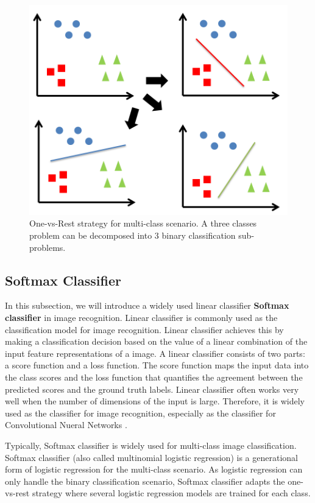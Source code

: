 \begin{figure}
	\centering
	\includegraphics[scale=.8]{relatedwork/fig/ovsa.png}
	\caption{One-vs-Rest strategy for multi-class scenario. A three classes problem can be decomposed into 3 binary classification sub-problems.}\label{fig:related:ovsa}
\end{figure}
\subsection{Softmax Classifier}
In this subsection, we will introduce a widely used linear classifier \textbf{Softmax classifier} in image recognition. Linear classifier is commonly used as the classification model for image recognition. Linear classifier achieves this by making a classification decision based on the value of a linear combination of the input feature representations of a image. A linear classifier consists of two parts: a score function and a loss function\cite{vapnik1999overview}. The score function maps the input data into the class scores and the loss function that quantifies the agreement between the predicted scores and the ground truth labels. Linear classifier often works very well when the number of dimensions of the input is large. Therefore, it is widely used as the classifier for image recognition, especially as the classifier for Convolutional Nueral Networks \cite{lecun1989backpropagation}. 

Typically, Softmax classifier is widely used for multi-class image classification.
Softmax classifier (also called multinomial logistic regression) is a generational form of logistic regression for the multi-class scenario. As logistic regression can only handle the binary classification scenario, Softmax classifier adapts the one-vs-rest strategy where several logistic regression models are trained for each class. 

